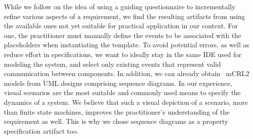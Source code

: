\documentclass[letter]{llncs}
\begin{document}
While we follow 
on the idea of using a guiding questionnaire to incrementally refine various aspects
of a requirement, we find the resulting artifacts from using the available ones 
not yet suitable for practical application in our context.
For one, the practitioner must manually define the events to be associated with the placeholders when 
instantiating the template. To avoid potential errors, as well as
reduce effort in specifications, we want to ideally stay in the same IDE used
for modeling the system, and select only existing events that represent
valid communication between components.  
In addition, we can already obtain~\cite{DBLP:dblp_conf/nfm/RemenskaTWHVCB13} mCRL2 models from UML designs comprising sequence diagrams.
In our experience, visual scenarios are the most suitable and commonly used  
means to specify the dynamics of a system. 
We believe that such a visual depiction of a scenario, more than finite state machines, 
improves the practitioner's understanding of the requirement as well. 
This is why we chose sequence diagrams as a property specification artifact too.
\end{document}
